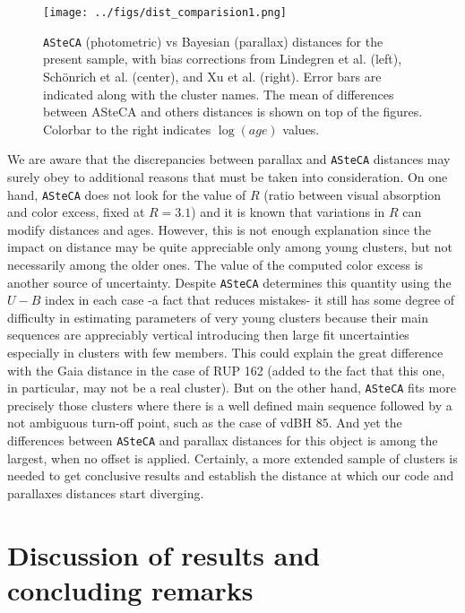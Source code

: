 \documentclass[draft]{aa}
\begin{document}
\begin{figure}[ht]
    \centering
    \texttt{[image: ../figs/dist\_comparision1.png]}
    \caption{\texttt{ASteCA} (photometric) vs Bayesian (parallax) distances for
    the present sample, with bias corrections from Lindegren et al. (left),
    Sch\"onrich et al. (center), and Xu et al. (right). Error bars are
    indicated along with the cluster names. The mean of differences between
    ASteCA and others distances is shown on top of the figures. Colorbar to
    the right indicates $\log(age)$ values.}
    \label{fig:prlxbias}
\end{figure}

We are aware that the discrepancies between parallax and \texttt{ASteCA}
distances may surely obey to additional reasons that must be taken into
consideration. On one hand, \texttt{ASteCA} does not look for the value of $R$ 
(ratio between visual absorption and color excess, fixed at $R=3.1$) and it is
known that variations in $R$ can modify distances and ages. However, this is
not enough explanation since the impact on distance may be quite appreciable
only among young clusters, but not necessarily among the older ones. The value
of the computed color excess is another source of uncertainty. 
Despite \texttt{ASteCA} determines this quantity using the $U-B$ index in each
case -a fact that reduces mistakes- it still has some degree of difficulty in
estimating parameters of very young clusters because their main sequences are
appreciably vertical introducing then large fit uncertainties especially in
clusters with few members. This could explain the great difference with the
Gaia distance in the case of RUP 162 (added to the fact that this one, in
particular, may not be a real cluster). But on the other hand, \texttt{ASteCA}
fits more precisely those clusters where there is a well defined main sequence
followed by a not ambiguous turn-off point, such as the case of vdBH 85. And
yet the differences between \texttt{ASteCA} and parallax distances for this
object is among the largest, when no offset is applied. Certainly, a more
extended sample of clusters is needed to get conclusive results and establish
the distance at which our code and parallaxes distances start diverging. 




\section{Discussion of results and concluding remarks}
\label{sec:results_concl}
\end{document}
